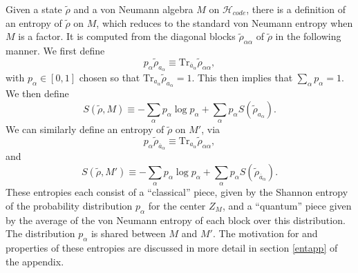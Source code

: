 \documentclass[12pt]{article}
\newcommand{\be}{\begin{equation}}
\newcommand{\ee}{\end{equation}}
\newcommand{\Tr}{\mathrm{Tr}}
\newcommand{\wt}{\widetilde}
\newcommand{\ab}{\ol{a}}
\newcommand{\Hc}{\mathcal{H}_{code}}
\newcommand{\ol}{\overline}
\begin{document}
Given a state $\wt{\rho}$ and a von Neumann algebra $M$ on $\Hc$, there is a definition of an entropy of $\wt{\rho}$ on $M$, which reduces to the standard von Neumann entropy when $M$ is a factor.  It is computed from the diagonal blocks $\wt{\rho}_{\alpha\alpha}$ of $\wt{\rho}$ in the following manner.  We first define
\be\label{prho}
p_\alpha \wt{\rho}_{a_\alpha}\equiv \Tr_{\ab_\alpha}\wt{\rho}_{\alpha\alpha},
\ee
with $p_\alpha\in [0,1]$ chosen so that $\Tr_{a_\alpha} \wt{\rho}_{a_\alpha}=1$.  This then implies that $\sum_\alpha p_\alpha=1$.  We then define
\be\label{entform}
S(\wt{\rho},M)\equiv -\sum_\alpha p_\alpha \log p_\alpha+\sum_\alpha p_\alpha S\left(\wt{\rho}_{a_\alpha}\right).
\ee
We can similarly define an entropy of $\wt{\rho}$ on $M'$, via
\be\label{prhop}
p_\alpha \wt{\rho}_{\ab_\alpha}\equiv \Tr_{a_\alpha}\wt{\rho}_{\alpha\alpha},
\ee
and
\be
S(\wt{\rho},M')\equiv -\sum_\alpha p_\alpha \log p_\alpha+\sum_\alpha p_\alpha S\left(\wt{\rho}_{\ab_\alpha}\right).
\ee
These entropies each consist of a ``classical'' piece, given by the Shannon entropy of the probability distribution $p_\alpha$ for the center $Z_M$, and a ``quantum'' piece given by the average of the von Neumann entropy of each block over this distribution.  The distribution $p_\alpha$ is shared between $M$ and $M'$.  The motivation for and properties of these entropies are discussed in more detail in section \ref{entapp} of the appendix.
\end{document}
